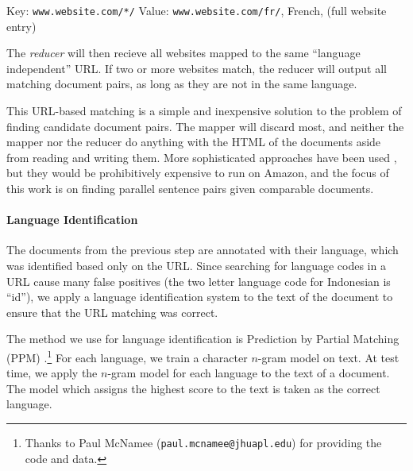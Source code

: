 \noindent Key: {\tt www.website.com/*/}
\noindent Value: {\tt www.website.com/fr/}, French, (full website entry)

The {\em reducer} will then recieve all websites mapped to the same
``language independent'' URL. If two or more websites match, the reducer will
output all matching document pairs, as long as they are not in the same
language.

This URL-based matching is a simple and inexpensive solution to the problem of
finding candidate document pairs. The mapper will discard most, and neither the
mapper nor the reducer do anything with the HTML of the documents aside from
reading and writing them. More sophisticated approaches have been used
\citep{Uszkoreit10, Ture12}, but they would be prohibitively expensive to run on
Amazon, and the focus of this work is on finding parallel sentence pairs given
comparable documents.


\paragraph{Language Identification}
The documents from the previous step are annotated with their language, which
was identified based only on the URL. Since searching for language codes in a
URL cause many false positives (the two letter language code for Indonesian is
``id''), we apply a language identification system to the text of the document
to ensure that the URL matching was correct. 

The method we use for language identification is Prediction by Partial Matching
(PPM) \citep{Cleary84}.\footnote{Thanks to Paul McNamee
({\tt paul.mcnamee@jhuapl.edu}) for providing the code and data.} For each
language, we train a character $n$-gram model on text. At test time, we apply
the $n$-gram model for each language to the text of a document. The model which
assigns the highest score to the text is taken as the correct language.


